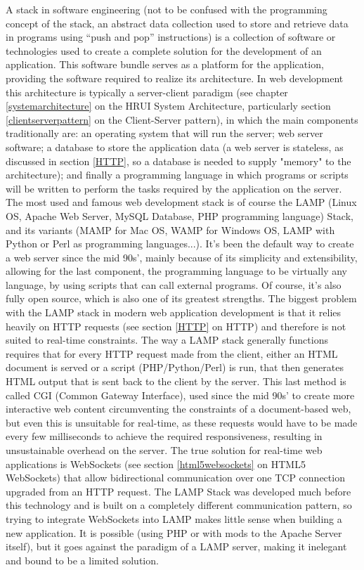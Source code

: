 A stack in software engineering (not to be confused with the programming concept of the stack, an abstract data collection
used to store and retrieve data in programs using ``push and pop'' instructions) is a collection of software or technologies
used to create a complete solution for the development of an application. This software bundle serves as a platform for the
application, providing the software required to realize its architecture. In web development this architecture is typically a
server-client paradigm (see chapter \ref{systemarchitecture} on the HRUI System Architecture, particularly section 
\ref{clientserverpattern} on the Client-Server pattern), in which the main components traditionally are: an operating system that will run the server; web server software; a database to store the application data (a web server is stateless, as discussed in section \ref{HTTP}, so a database is needed to supply "memory" to the architecture); and finally a programming language in which programs or scripts will be written to perform the tasks required by the application on the server.\\

The most used and famous web development stack is of course the LAMP (Linux OS, Apache Web Server, MySQL Database, PHP
programming language) Stack, and its variants (MAMP for Mac OS, WAMP for Windows OS, LAMP with Python or Perl as programming
languages...). It's been the default way to create a web server since the mid 90s', mainly because of its simplicity and
extensibility, allowing for the last component, the programming language to be virtually any language, by using scripts that
can call external programs. Of course, it's also fully open source, which is also one of its greatest strengths. The biggest
problem with the LAMP stack in modern web application development is that it relies heavily on HTTP requests (see section \ref{HTTP} on HTTP) and therefore is not suited to real-time constraints. The way a LAMP stack generally functions requires that
for every HTTP request made from the client, either an HTML document is served or a script (PHP/Python/Perl) is run, that then
generates HTML output that is sent back to the client by the server. This last method is called CGI (Common Gateway
Interface), used since the mid 90s' to create more interactive web content circumventing the constraints of a document-based
web, but even this is unsuitable for real-time, as these requests would have to be made every few milliseconds to achieve the
required responsiveness, resulting in unsustainable overhead on the server. The true solution for real-time web applications
is WebSockets (see section \ref{html5websockets} on HTML5 WebSockets) that allow bidirectional communication over one TCP
connection upgraded from an HTTP request. The LAMP Stack was developed much before this technology and is built on a
completely different communication pattern, so trying to integrate WebSockets into LAMP makes little sense when building a new
application. It is possible (using PHP or with mods to the Apache Server itself), but it goes against the paradigm of a LAMP
server, making it inelegant and bound to be a limited solution.\\


